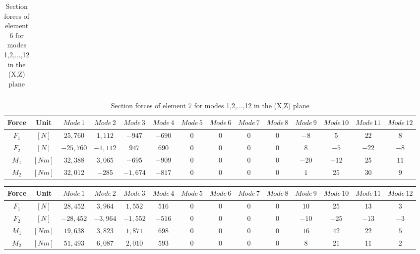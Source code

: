 \documentclass[11pt,a4paper,titlepage]{report}
\begin{document}
\begin{appendix}
\begin{landscape}
\begin{table}[]
\begin{tiny}
\begin{tabular}{c|c|c|c|c|c|c|c|c|c|c|c|c|c}
        \end{tabular}
        \end{tiny}
    \caption{Section forces of element 6 for modes 1,2,...,12 in the (X,Z) plane}
    \label{tab:my_label}
\end{table}
\newpage
\begin{table}[]
    \centering
    \begin{tiny}
    \begin{tabular}{c|c|c|c|c|c|c|c|c|c|c|c|c|c}
    Force & Unit & $Mode\,1$ & $Mode\,2$ & $Mode\,3$ & $Mode\,4$ & $Mode\,5$ & $Mode\,6$ & $Mode\,7$ & $Mode\,8$ & $Mode\,9$ & $Mode\,10$ & $Mode\,11$ & $Mode\,12$\\
    \hline
   $F_1$ & $[N]$ & $25,760$ & $1,112$ & $-947$ & $-690$ & $0$ & $0$ & $0$ & $0$ & $-8$ & $5$ & $22$ &  $8$\\
   $F_2$ & $[N]$ & $-25,760$ & $-1,112$ & $947$ & $690$ & $0$ & $0$ & $0$ & $0$ & $8$ & $-5$ & $-22$ &  $-8$\\
    $M_1$ & $[Nm]$ & $32,388$ & $3,065$ & $-695$ & $-909$ & $0$ & $0$ & $0$ & $0$ & $-20$ & $-12$ & $25$ &  $11$\\
    $M_2$ & $[Nm]$ & $32,012$ &  $-285$ &  $-1,674$ &  $-817$ & $0$ & $0$ & $0$ & $0$ & $1$ & $25$ & $30$ & $9$\\
        \end{tabular}
        \end{tiny}
    \caption{Section forces of element 7 for modes 1,2,...,12 in the (X,Z) plane}
    \label{tab:my_label}
\end{table}
\begin{table}[]
    \centering
    \begin{tiny}
    \begin{tabular}{c|c|c|c|c|c|c|c|c|c|c|c|c|c}
    Force & Unit & $Mode\,1$ & $Mode\,2$ & $Mode\,3$ & $Mode\,4$ & $Mode\,5$ & $Mode\,6$ & $Mode\,7$ & $Mode\,8$ & $Mode\,9$ & $Mode\,10$ & $Mode\,11$ & $Mode\,12$\\
    \hline
   $F_1$ & $[N]$ & $28,452$ & $3,964$ & $1,552$ & $516$ & $0$ & $0$ & $0$ & $0$ & $10$ & $25$ & $13$ &  $3$\\
   $F_2$ & $[N]$ & $-28,452$ & $-3,964$ & $-1,552$ & $-516$ & $0$ & $0$ & $0$ & $0$ & $-10$ & $-25$ & $-13$ &  $-3$\\
    $M_1$ & $[Nm]$ & $19,638$ & $3,823 $ & $ 1,871 $ & $698$ & $0$ & $0$ & $0$ & $0$ & $16$ & $42$ & $22$ &  $5$\\
    $M_2$ & $[Nm]$ & $51,493$ &  $6,087 $ &  $2,010$ &  $593$ & $0$ & $0$ & $0$ & $0$ & $8$ & $21$ & $11$ & $2$\\

\end{tabular}
\end{tiny}
\end{table}
\end{landscape}
\end{appendix}
\end{document}
